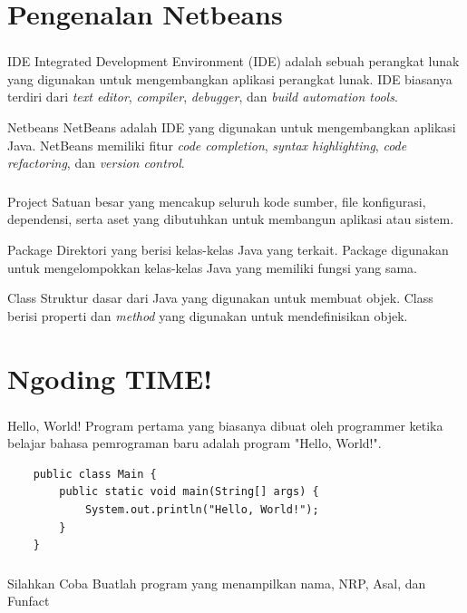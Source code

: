 \documentclass[aspectratio=169]{beamer}
\theoremstyle{definition}
\begin{document}
    \section{Pengenalan Netbeans}
    \begin{frame}
        \frametitle{\insertsection}
        \begin{block}{IDE}
            Integrated Development Environment (IDE) adalah sebuah perangkat lunak yang digunakan untuk mengembangkan aplikasi perangkat lunak. IDE biasanya terdiri dari \textit{text editor}, \textit{compiler}, \textit{debugger}, dan \textit{build automation tools}.
        \end{block}
        \begin{block}{Netbeans}
            NetBeans adalah IDE yang digunakan untuk mengembangkan aplikasi Java. NetBeans memiliki fitur \textit{code completion}, \textit{syntax highlighting}, \textit{code refactoring}, dan \textit{version control}.
        \end{block}
    \end{frame}

    \begin{frame}
        \frametitle{\insertsection}
        \begin{exampleblock}{Project}
            Satuan besar yang mencakup seluruh kode sumber, file konfigurasi, dependensi, serta aset yang dibutuhkan untuk membangun aplikasi atau sistem.
        \end{exampleblock}
        \begin{exampleblock}{Package}
            Direktori yang berisi kelas-kelas Java yang terkait. Package digunakan untuk mengelompokkan kelas-kelas Java yang memiliki fungsi yang sama.
        \end{exampleblock}
        \begin{exampleblock}{Class}
            Struktur dasar dari Java yang digunakan untuk membuat objek. Class berisi properti dan \textit{method} yang digunakan untuk mendefinisikan objek.
        \end{exampleblock}
    \end{frame}

    \section{Ngoding TIME!}
    \begin{frame}[fragile]
        \frametitle{\insertsection}
        \begin{block}{Hello, World!}
            Program pertama yang biasanya dibuat oleh programmer ketika belajar bahasa pemrograman baru adalah program "Hello, World!".
        \end{block}
        \begin{lstlisting}
    public class Main {
        public static void main(String[] args) {
            System.out.println("Hello, World!");
        }
    }
        \end{lstlisting}
    \end{frame}

    \begin{frame}
        \frametitle{\insertsection}
        \begin{block}{Silahkan Coba}
            Buatlah program yang menampilkan nama, NRP, Asal, dan Funfact
        \end{block}
    \end{frame}
\end{document}
